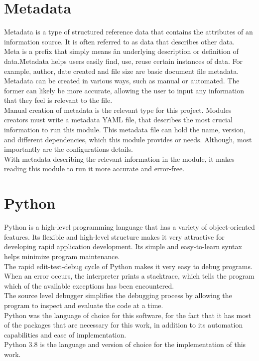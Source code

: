 \section{Metadata}
Metadata is a type of structured reference data that contains the attributes of an information source. It is often referred to as data that describes other data.\\
Meta is a prefix that simply means \"an underlying description or definition of data.\" Metadata helps users easily find, use, reuse certain instances of data. For example, author, date created and file size are basic document file metadata.
Metadata can be created in various ways, such as manual or automated. The former can likely be more accurate, allowing the user to input any information that they feel is relevant to the file\cite{Kranz2021Jul}.\\
Manual creation of metadata is the relevant type for this project. Modules creators must write a metadata YAML file, that describes the most crucial information to run this module.
This metadata file can hold the name, version, and different dependencies, which this module provides or needs. Although, most importantly are the configurations details.\\
With metadata describing the relevant information in the module, it makes reading this module to run it more accurate and error-free.


\section{Python}
Python is a high-level programming language that has a variety of object-oriented features. Its flexible and high-level structure makes it very attractive for developing rapid application development. Its simple and easy-to-learn syntax helps minimize program maintenance.\\
The rapid edit-test-debug cycle of Python makes it very easy to debug programs. When an error occurs, the interpreter prints a stacktrace, which tells the program which of the available exceptions has been encountered.\\
The source level debugger simplifies the debugging process by allowing the program to inspect and evaluate the code at a time\cite{python.org}.\\
Python was the language of choice for this software, for the fact that it has most of the packages that are necessary for this work, in addition to its automation capabilities and ease of implementation.\\
Python 3.8 is the language and version of choice for the implementation of this work.


